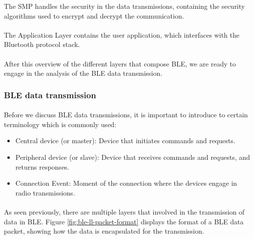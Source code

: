 The \acf{SMP} handles the security in the data transmissions, containing the security algorithms used to encrypt and decrypt the communication.

\paragraph{} The Application Layer contains the user application, which interfaces with the Bluetooth protocol stack.

\paragraph{} After this overview of the different layers that compose \acs{BLE}, we are ready to engage in the analysis of the \acs{BLE} data transmission.

\subsubsection{\acs{BLE} data transmission}

\paragraph{} Before we discuss \acs{BLE} data transmissions, it is important to introduce to certain terminology which is commonly used:

\begin{itemize}
    \item Central device (or master): Device that initiates commands and requests.
    \item Peripheral device (or slave): Device that receives commands and requests, and returns responses.
    \item Connection Event: Moment of the connection where the devices engage in radio transmissions.
\end{itemize}

\paragraph{} As seen previously, there are multiple layers that involved in the transmission of data in \acs{BLE}. Figure \ref{fig:ble-ll-packet-format} displays the format of a \acs{BLE} data packet, showing how the data is encapsulated for the transmission.

